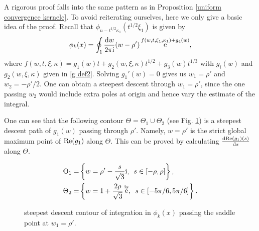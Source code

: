 \documentclass[cmp]{svjour}
\numberwithin{theorem}{section}
\numberwithin{equation}{section}
\DeclareMathOperator{\e}{e}
\def\dd{{\rm d}}
\def\ii{{\rm i}}
\begin{document}
A rigorous proof falls into the same pattern as in Proposition \ref{uniform convergence kernelc}.
To avoid reiterating ourselves, here we only give a basic idea of the proof. Recall that $\phi_{n-t^{1/2}\kappa_1}( t^{1/2}\xi_1)$ is given by
\[
\phi_k(x) = \oint_1 \frac{\dd w}{2\pi\ii}
(w-\rho')
\e^{f(w,t,\xi_1, \kappa_1)+g_4(w)},
\]
where $f(w,t,\xi, \kappa)=g_1(w)t+g_2(w,\xi, \kappa)t^{1/2}+g_3(w)t^{1/3}$ with $g_i(w)$ and $g_2(w,\xi,\kappa)$ given in \eqref{g def2}. Solving $g_1'(w)=0$ gives us $w_1=\rho'$ and $w_2=-\rho'/2$. One can obtain a steepest descent through $w_1=\rho'$, since the one passing $w_2$ would include extra poles at origin and hence vary the estimate of the integral.

One can see that the following contour $\Theta=\Theta_1\cup\Theta_2$ (see Fig. \ref{fig:contour gaussian 1}) is a steepest descent path of $g_1(w)$ passing through $\rho'$. Namely, $w=\rho'$ is the strict global maximum point of ${\rm Re}(g_1)$ along $\Theta$. This can be proved by calculating $\frac{\dd {\rm Re}(g_1)(s)}{\dd s}$ along $\Theta$.

\begin{subequations}
\label{gamma2}
\begin{align}
\Theta_1=&\left\{w=\rho'-\frac{s}{\sqrt{3}} \ii , \,\,\,s\in[-\rho,\rho]\right\},
\\
\Theta_2=&\left\{w=1+ \frac{2\rho}{\sqrt{3}}\e^{\ii s} , \,\,\,s\in[-5\pi/6,5\pi/6]\right\}.
\end{align}
\end{subequations}


\begin{figure}[h]
\begin{center}
\end{center}
\caption{steepest descent contour of integration in $\phi_k(x)$ passing the saddle point at $w_1=\rho'$.}
\label{fig:contour gaussian 1}
\end{figure}
\end{document}
